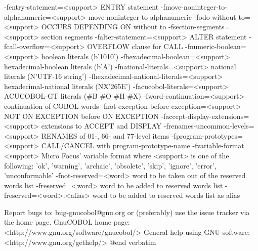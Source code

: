   -fentry-statement=<support> ENTRY statement
  -fmove-noninteger-to-alphanumeric=<support> move noninteger to alphanumeric
  -fodo-without-to=<support> OCCURS DEPENDING ON without to
  -fsection-segments=<support> section segments
  -falter-statement=<support> ALTER statement
  -fcall-overflow=<support> OVERFLOW clause for CALL
  -fnumeric-boolean=<support> boolean literals (b'1010')
  -fhexadecimal-boolean=<support> hexadecimal-boolean literals (b'A')
  -fnational-literals=<support> national literals (N'UTF-16 string')
  -fhexadecimal-national-literals=<support> hexadecimal-national literals (NX'265E')
  -facucobol-literals=<support> ACUCOBOL-GT literals (#B #O #H #X)
  -fword-continuation=<support> continuation of COBOL words
  -fnot-exception-before-exception=<support> NOT ON EXCEPTION before ON EXCEPTION
  -faccept-display-extensions=<support> extensions to ACCEPT and DISPLAY
  -frenames-uncommon-levels=<support> RENAMES of 01-, 66- and 77-level items
  -fprogram-prototypes=<support> CALL/CANCEL with program-prototype-name
  -fvariable-format=<support> Micro Focus' variable format
	where <support> is one of the following:
	'ok', 'warning', 'archaic', 'obsolete', 'skip', 'ignore', 'error', 'unconformable'
  -fnot-reserved=<word> word to be taken out of the reserved words list
  -freserved=<word>     word to be added to reserved words list
  -freserved=<word>:<alias> word to be added to reserved words list as alias


Report bugs to: bug-gnucobol@gnu.org
or (preferably) use the issue tracker via the home page.
GnuCOBOL home page: <http://www.gnu.org/software/gnucobol/>
General help using GNU software: <http://www.gnu.org/gethelp/>
@end verbatim


